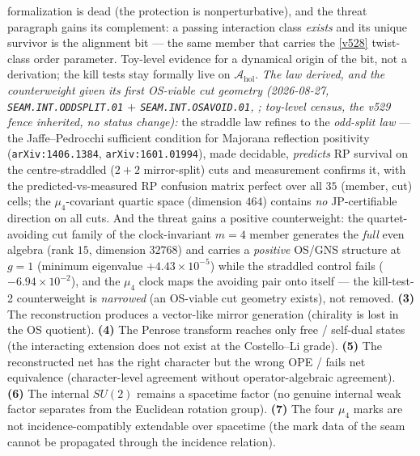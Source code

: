 \documentclass[11pt,a4paper]{article}
\begin{document}
formalization is dead (the protection is nonperturbative), and the threat paragraph gains its
complement: a passing interaction class \emph{exists} and its unique survivor is the alignment
bit --- the same member that carries the \vref{v528} twist-class order parameter. Toy-level
evidence for a dynamical origin of the bit, not a derivation; the kill tests stay formally live
on $\mathcal A_{\mathrm{hol}}$.
\emph{The law derived, and the counterweight given its first OS-viable cut geometry
(2026-08-27, \texttt{SEAM.INT.ODDSPLIT.01} $+$ \texttt{SEAM.INT.OSAVOID.01},
; toy-level census, the v529 fence inherited, no
status change):} the straddle law refines to the \emph{odd-split law} --- the
Jaffe--Pedrocchi sufficient condition for Majorana reflection positivity
(\texttt{arXiv:1406.1384}, \texttt{arXiv:1601.01994}), made decidable, \emph{predicts} RP
survival on the centre-straddled ($2{+}2$ mirror-split) cuts and measurement confirms it,
with the predicted-vs-measured RP confusion matrix perfect over all $35$ (member, cut)
cells; the $\mu_4$-covariant quartic space (dimension $464$) contains \emph{no}
JP-certifiable direction on all cuts. And the threat gains a positive counterweight: the
quartet-avoiding cut family of the clock-invariant $m{=}4$ member generates the \emph{full}
even algebra (rank $15$, dimension $32768$) and carries a \emph{positive} OS/GNS structure
at $g{=}1$ (minimum eigenvalue $+4.43\times10^{-5}$) while the straddled control fails
($-6.94\times10^{-2}$), and the $\mu_4$ clock maps the avoiding pair onto itself --- the
kill-test-2 counterweight is \emph{narrowed} (an OS-viable cut geometry exists), not
removed.
\textbf{(3)} The reconstruction produces a vector-like mirror generation (chirality is lost in the
OS quotient).
\textbf{(4)} The Penrose transform reaches only free / self-dual states (the interacting extension
does not exist at the Costello--Li grade).
\textbf{(5)} The reconstructed net has the right character but the wrong OPE / fails net equivalence
(character-level agreement without operator-algebraic agreement).
\textbf{(6)} The internal $SU(2)$ remains a spacetime factor (no genuine internal weak factor
separates from the Euclidean rotation group).
\textbf{(7)} The four $\mu_4$ marks are not incidence-compatibly extendable over spacetime (the
mark data of the seam cannot be propagated through the incidence relation).
\end{document}
